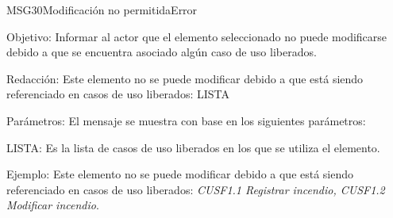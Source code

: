 \begin{mensaje}{MSG30}{Modificación no permitida}{Error}
    \item[Objetivo:] Informar al actor que el elemento seleccionado no puede modificarse debido a que se encuentra asociado algún caso de uso liberados.
    \item[Redacción:] Este elemento no se puede modificar debido a que está siendo referenciado en casos de uso liberados: LISTA
    \item[Parámetros:] El mensaje se muestra con base en los siguientes parámetros:
    \begin{Citemize}
	\item LISTA: Es la lista de casos de uso liberados en los que se utiliza el elemento.
    \end{Citemize}
    \item[Ejemplo:] Este elemento no se puede modificar debido a que está siendo referenciado en casos de uso liberados: {\em CUSF1.1 Registrar incendio, CUSF1.2 Modificar incendio}.
\end{mensaje}